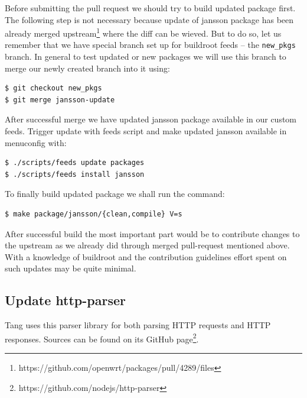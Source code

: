 Before submitting the pull request we should try to build updated package first.
The following step is not necessary because update of jansson package has been already merged upstream\footnote{https://github.com/openwrt/packages/pull/4289/files} where the diff can be wieved.
But to do so, let us remember that we have special branch set up for buildroot feeds -- the {\tt new\_pkgs} branch.
In general to test updated or new packages we will use this branch to merge our newly created branch into it using:
\begin{lstlisting}[columns=fixed,basicstyle=\ttfamily\footnotesize,tabsize=4,backgroundcolor=\color{yellow!10}]
$ git checkout new_pkgs
$ git merge jansson-update
\end{lstlisting}
After successful merge we have updated jansson package available in our custom feeds.
Trigger update with feeds script and make updated jansson available in menuconfig with:
\begin{lstlisting}[columns=fixed,basicstyle=\ttfamily\footnotesize,tabsize=4,backgroundcolor=\color{yellow!10}]
$ ./scripts/feeds update packages
$ ./scripts/feeds install jansson
\end{lstlisting}
To finally build updated package we shall run the command:
\begin{lstlisting}[columns=fixed,basicstyle=\ttfamily\footnotesize,tabsize=4,backgroundcolor=\color{yellow!10}]
$ make package/jansson/{clean,compile} V=s
\end{lstlisting}

After successful build the most important part would be to contribute changes to the upstream as we already did through merged pull-request mentioned above.
With a knowledge of buildroot and the contribution guidelines effort spent on such updates may be quite minimal.



\subsection{Update http-parser}\label{http-parser}
Tang uses this parser library for both parsing HTTP requests and HTTP responses.
Sources can be found on its GitHub page\footnote{https://github.com/nodejs/http-parser}.

